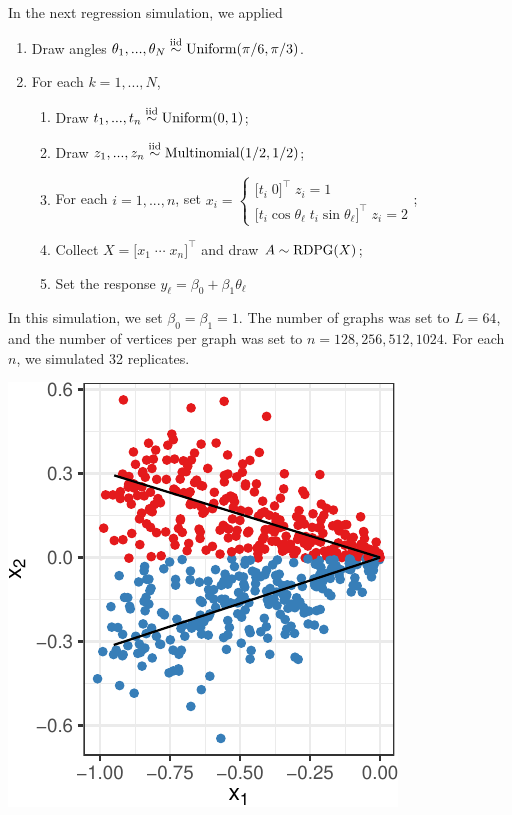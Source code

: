 \documentclass[12pt]{article}
\providecommand{\tightlist}{%
  \setlength{\itemsep}{0pt}\setlength{\parskip}{0pt}}
\begin{document}
In the next regression simulation, we applied

\begin{enumerate}
\def\labelenumi{\arabic{enumi}.}
\tightlist
\item
  Draw angles
  \(\theta_1, ..., \theta_N \stackrel{\mathrm{iid}}{\sim} \mathrm{Uniform}(\pi / 6, \pi / 3)\).
\item
  For each \(k = 1, ..., N\),

  \begin{enumerate}
  \def\labelenumii{\roman{enumii}.}
  \tightlist
  \item
    Draw \(t_1, ..., t_n \stackrel{\mathrm{iid}}{\sim} \mathrm{Uniform}(0, 1)\);
  \item
    Draw \(z_1, ..., z_n \stackrel{\mathrm{iid}}{\sim} \mathrm{Multinomial}(1/2, 1/2)\);
  \item
    For each \(i = 1, ..., n\), set
    \(x_i = \begin{cases} \bigl[ t_i \; 0 \bigr]^\top \; z_i = 1 \\ \bigl[ t_i \cos \theta_\ell \; t_i \sin \theta_\ell \bigr]^\top \; z_i = 2 \end{cases}\);
  \item
    Collect \(X = \bigl[ x_1 \; \cdots \; x_n \bigr]^\top\) and draw
    \(A \sim \mathrm{RDPG}(X)\);
  \item
    Set the response \(y_\ell = \beta_0 + \beta_1 \theta_\ell\)
  \end{enumerate}
\end{enumerate}

In this simulation, we set \(\beta_0 = \beta_1 = 1\). The number of
graphs was set to \(L = 64\), and the number of vertices per graph was
set to \(n = 128, 256, 512, 1024\). For each \(n\), we simulated 32
replicates.

\begin{center}\includegraphics{draft_files/figure-latex/angle-reg-example-1} \end{center}
\end{document}
